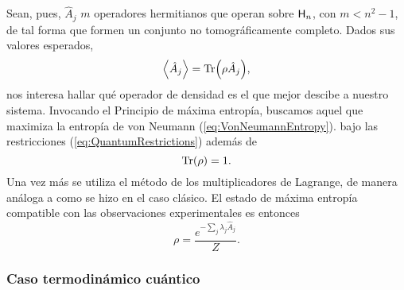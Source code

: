 Sean, pues, $\hat{A}_{j}$ $m$ operadores hermitianos que operan sobre ${\sf H}_{n}$, con $m<n^{2}-1$, de tal forma que formen un conjunto no tomográficamente completo. Dados sus valores esperados,
\begin{equation}\label{eq:QuantumRestrictions}
    \expval{\hat{A}_{j}}=\Tr(\rho \hat{A}_{j}),
\end{equation} 
nos interesa hallar qué operador de densidad es el que mejor descibe a nuestro sistema. Invocando el Principio de máxima entropía, buscamos aquel que maximiza la entropía de von Neumann (\ref{eq:VonNeumannEntropy}). bajo las restricciones (\ref{eq:QuantumRestrictions}) además de
\begin{equation}\label{eq:TraceRestriction}
    \Tr(\rho)=1.
\end{equation}
Una vez más se utiliza el método de los multiplicadores de Lagrange, de manera análoga a como se hizo en el caso clásico. El estado de máxima entropía compatible con las observaciones experimentales es entonces
\begin{equation*}
    \rho=\frac{e^{-\sum_{j} \lambda_{j} \hat{A}_{j}}}{Z}.
\end{equation*}
\subsubsection{Caso termodinámico cuántico}
